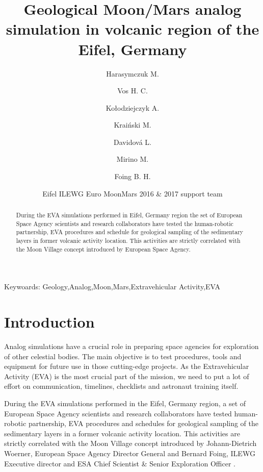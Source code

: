 \documentclass[preprint]{elsarticle}
\begin{document}
\begin{frontmatter}

\title{Geological Moon/Mars analog simulation in volcanic region of the Eifel, Germany}

\author[esa,uw,wsosp]{Harasymczuk M.}
\author[esa,ilewg,vu]{Vos H. C.}
\author[esa]{Kołodziejczyk A.}
\author[esa]{Kraiński M.}
\author[charles,qed]{Davidová L.}
\author[esa]{Mirino M.}
\author[esa,ilewg,vu]{Foing B. H.}
\author[esa,ilewg]{Eifel ILEWG Euro MoonMars 2016 & 2017 support team}

\address[esa]{ESA ESTEC, Postbus 299, 2200 AG Noordwijk, NL}
\address[ilewg]{International Lunar Exploration Working Group}
\address[vu]{Vrije Universiteit Amsterdam}
\address[charles]{Charles University}
\address[qed]{QED Group}
\address[uw]{University of Warsaw}
\address[wsosp]{Polish Air Force University}

\begin{abstract}
During the EVA simulations performed in Eifel, Germany region the set of European Space Agency scientists and research collaborators have tested the human-robotic partnership, EVA procedures and schedule for geological sampling of the sedimentary layers in former volcanic activity location. This activities are strictly correlated with the Moon Village concept introduced by European Space Agency.
\end{abstract}

\begin{keyword}
Keywoards: Geology\sep Analog\sep Moon\sep Mars\sep Extravehicular Activity\sep EVA
\end{keyword}

\end{frontmatter}
\linenumbers

\section{Introduction}
Analog simulations have a crucial role in preparing space agencies for exploration of other celestial bodies. The main objective is to test procedures, tools and equipment for future use in those cutting-edge projects. As the Extravehicular Activity (EVA) is the most crucial part of the mission, we need to put a lot of effort on communication, timelines, checklists and astronaut training itself.

During the EVA simulations performed in the Eifel, Germany region, a set of European Space Agency scientists and research collaborators have tested human-robotic partnership, EVA procedures and schedules for geological sampling of the sedimentary layers in a former volcanic activity location. This activities are strictly correlated with the Moon Village concept introduced by Johann-Dietrich Woerner, European Space Agency Director General and Bernard Foing, ILEWG Executive director and ESA Chief Scientist & Senior Exploration Officer \cite{ref18}\cite{ref19}.
\end{document}
